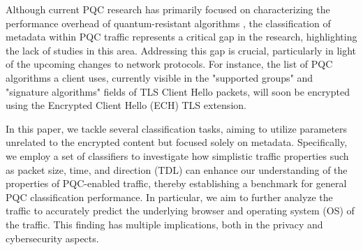\documentclass[10pt,journal]{IEEEtran}%
\begin{document}
Although current PQC research has primarily focused on characterizing the performance overhead of quantum-resistant algorithms \cite{Sikeridis2020PostQuantumAI, Raavi_phd, Raavi_paper, PQC_KEMS, PQC_IoT, TLS_Mobile, liu2024post}, the classification of metadata within PQC traffic represents a critical gap in the research, highlighting the lack of studies in this area. Addressing this gap is crucial, particularly in light of the upcoming changes to network protocols. For instance, the list of PQC algorithms a client uses, currently visible in the "supported groups" and "signature algorithms" fields of TLS Client Hello packets, will soon be encrypted using the Encrypted Client Hello (ECH) TLS extension. 



In this paper, we tackle several classification tasks, aiming to utilize parameters unrelated to the encrypted content but focused solely on metadata. Specifically, we employ a set of classifiers to investigate how simplistic traffic properties such as packet size, time, and direction (TDL) can enhance our understanding of the properties of PQC-enabled traffic, thereby establishing a benchmark for general PQC classification performance. In particular, we aim to further analyze the traffic to accurately predict the underlying browser and operating system (OS) of the traffic. This finding has multiple implications, both in the privacy and cybersecurity aspects.
\end{document}
